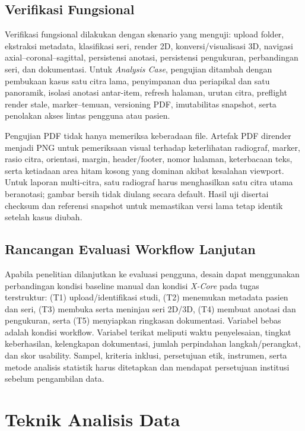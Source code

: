 \documentclass[12pt,a4paper,oneside]{report}
\newcommand{\xcore}{\textit{X-Core}}
\begin{document}
\subsection{Verifikasi Fungsional}

Verifikasi fungsional dilakukan dengan skenario yang menguji: upload folder, ekstraksi metadata, klasifikasi seri, render 2D, konversi/visualisasi 3D, navigasi axial--coronal--sagittal, persistensi anotasi, persistensi pengukuran, perbandingan seri, dan dokumentasi. Untuk \textit{Analysis Case}, pengujian ditambah dengan pembukaan kasus satu citra lama, penyimpanan dua periapikal dan satu panoramik, isolasi anotasi antar-item, refresh halaman, urutan citra, preflight render stale, marker--temuan, versioning PDF, imutabilitas snapshot, serta penolakan akses lintas pengguna atau pasien.

Pengujian PDF tidak hanya memeriksa keberadaan file. Artefak PDF dirender menjadi PNG untuk pemeriksaan visual terhadap keterlihatan radiograf, marker, rasio citra, orientasi, margin, header/footer, nomor halaman, keterbacaan teks, serta ketiadaan area hitam kosong yang dominan akibat kesalahan viewport. Untuk laporan multi-citra, satu radiograf harus menghasilkan satu citra utama beranotasi; gambar bersih tidak diulang secara default. Hasil uji disertai checksum dan referensi snapshot untuk memastikan versi lama tetap identik setelah kasus diubah.

\subsection{Rancangan Evaluasi Workflow Lanjutan}

Apabila penelitian dilanjutkan ke evaluasi pengguna, desain dapat menggunakan perbandingan kondisi baseline manual dan kondisi \xcore{} pada tugas terstruktur: (T1) upload/identifikasi studi, (T2) menemukan metadata pasien dan seri, (T3) membuka serta meninjau seri 2D/3D, (T4) membuat anotasi dan pengukuran, serta (T5) menyiapkan ringkasan dokumentasi. Variabel bebas adalah kondisi workflow. Variabel terikat meliputi waktu penyelesaian, tingkat keberhasilan, kelengkapan dokumentasi, jumlah perpindahan langkah/perangkat, dan skor usability. Sampel, kriteria inklusi, persetujuan etik, instrumen, serta metode analisis statistik harus ditetapkan dan mendapat persetujuan institusi sebelum pengambilan data.

\section{Teknik Analisis Data}
\end{document}
